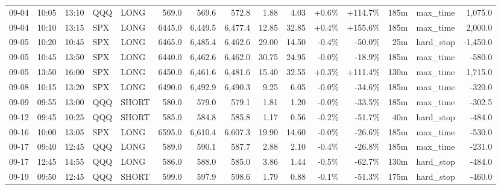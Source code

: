 \documentclass[11pt,a4paper,twoside]{article}
\begin{document}
\begin{landscape}
\begin{center}
\begin{longtable}{>{\color{txtmain}}l l l l l r r r r r r r r >{\color{txtmain}}l r}
09-04 & 10:05 & 13:10 & QQQ & LONG & 569.0 & 569.6 & 572.8 & 1.88 & 4.03 & \textcolor{wingreen}{+0.6\%} & \textcolor{wingreen}{+114.7\%} & 185m & max\_time & \textcolor{wingreen}{1,075.0} \\
09-04 & 10:10 & 13:15 & SPX & LONG & 6445.0 & 6,449.5 & 6,477.4 & 12.85 & 32.85 & \textcolor{wingreen}{+0.4\%} & \textcolor{wingreen}{+155.6\%} & 185m & max\_time & \textcolor{wingreen}{2,000.0} \\
09-05 & 10:20 & 10:45 & SPX & LONG & 6465.0 & 6,485.4 & 6,462.6 & 29.00 & 14.50 & \textcolor{lossred}{-0.4\%} & \textcolor{lossred}{-50.0\%} & 25m & hard\_stop & \textcolor{lossred}{-1,450.0} \\
09-05 & 10:45 & 13:50 & SPX & LONG & 6440.0 & 6,462.6 & 6,462.0 & 30.75 & 24.95 & \textcolor{lossred}{-0.0\%} & \textcolor{lossred}{-18.9\%} & 185m & max\_time & \textcolor{lossred}{-580.0} \\
09-05 & 13:50 & 16:00 & SPX & LONG & 6450.0 & 6,461.6 & 6,481.6 & 15.40 & 32.55 & \textcolor{wingreen}{+0.3\%} & \textcolor{wingreen}{+111.4\%} & 130m & max\_time & \textcolor{wingreen}{1,715.0} \\
09-08 & 10:15 & 13:20 & SPX & LONG & 6490.0 & 6,492.9 & 6,490.3 & 9.25 & 6.05 & \textcolor{lossred}{-0.0\%} & \textcolor{lossred}{-34.6\%} & 185m & max\_time & \textcolor{lossred}{-320.0} \\
09-09 & 09:55 & 13:00 & QQQ & SHORT & 580.0 & 579.0 & 579.1 & 1.81 & 1.20 & \textcolor{lossred}{-0.0\%} & \textcolor{lossred}{-33.5\%} & 185m & max\_time & \textcolor{lossred}{-302.5} \\
09-12 & 09:45 & 10:25 & QQQ & SHORT & 585.0 & 584.8 & 585.8 & 1.17 & 0.56 & \textcolor{lossred}{-0.2\%} & \textcolor{lossred}{-51.7\%} & 40m & hard\_stop & \textcolor{lossred}{-484.0} \\
09-16 & 10:00 & 13:05 & SPX & LONG & 6595.0 & 6,610.4 & 6,607.3 & 19.90 & 14.60 & \textcolor{lossred}{-0.0\%} & \textcolor{lossred}{-26.6\%} & 185m & max\_time & \textcolor{lossred}{-530.0} \\
09-17 & 09:40 & 12:45 & QQQ & LONG & 589.0 & 590.1 & 587.7 & 2.88 & 2.10 & \textcolor{lossred}{-0.4\%} & \textcolor{lossred}{-26.8\%} & 185m & max\_time & \textcolor{lossred}{-231.0} \\
09-17 & 12:45 & 14:55 & QQQ & LONG & 586.0 & 588.0 & 585.0 & 3.86 & 1.44 & \textcolor{lossred}{-0.5\%} & \textcolor{lossred}{-62.7\%} & 130m & hard\_stop & \textcolor{lossred}{-484.0} \\
09-19 & 09:50 & 12:45 & QQQ & SHORT & 599.0 & 597.9 & 598.6 & 1.79 & 0.88 & \textcolor{lossred}{-0.1\%} & \textcolor{lossred}{-51.3\%} & 175m & hard\_stop & \textcolor{lossred}{-460.0} \\

\end{longtable}
\end{center}
\end{landscape}
\end{document}
